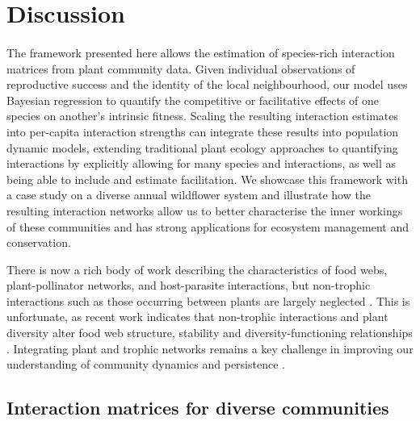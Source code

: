 \documentclass[a4,12pt]{article}
\begin{document}
\section{Discussion}
    
    \paragraph{}
    The framework presented here allows the estimation of species-rich interaction matrices from plant community data. Given individual observations of reproductive success and the identity of the local neighbourhood, our model uses Bayesian regression to quantify the competitive or facilitative effects of one species on another's intrinsic fitness. Scaling the resulting interaction estimates into per-capita interaction strengths can integrate these results into  population dynamic models, extending traditional plant ecology approaches to quantifying interactions by explicitly allowing for many species and interactions, as well as being able to include and estimate facilitation. We showcase this framework with a case study on a diverse annual wildflower system and illustrate how the resulting interaction networks allow us to better characterise the inner workings of these communities and has strong applications for ecosystem management and conservation.

    There is now a rich body of work describing the characteristics of food webs, plant-pollinator networks, and host-parasite interactions, but non-trophic interactions such as those occurring between plants are largely neglected \parencite{Ellison2019}. This is unfortunate, as recent work indicates that non-trophic interactions and plant diversity alter food web structure, stability and diversity-functioning relationships \parencite{Hammill2015, Giling2019, Zhao2019, Miele2019}. Integrating plant and trophic networks remains a key challenge in improving our understanding of community dynamics and persistence \parencite{Godoy2018c}. 

    \subsection{Interaction matrices for diverse communities}
\end{document}
